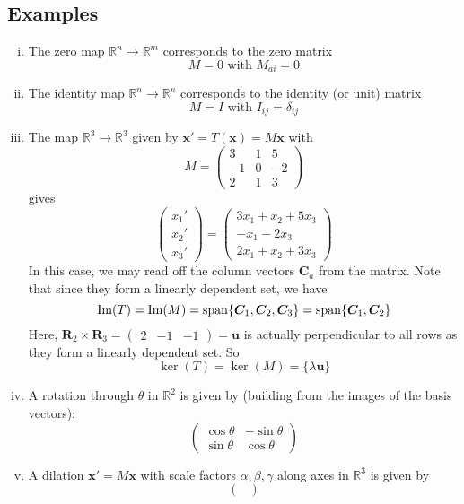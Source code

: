 \documentclass{article}
\begin{document}
	\subsection{Examples}
	\begin{enumerate}[(i)]
		\item The zero map $\mathbb R^n \to \mathbb R^m$ corresponds to the zero matrix
		\[ M = 0 \text{ with } M_{ai} = 0 \]
		\item The identity map $\mathbb R^n \to \mathbb R^n$ corresponds to the identity (or unit) matrix
		\[ M = I \text{ with } I_{ij} = \delta_{ij} \]
		\item The map $\mathbb R^3 \to \mathbb R^3$ given by $\bm x' = T(\bm x) = M\bm x$ with
		\[ M = \begin{pmatrix}
			3 & 1 & 5 \\
			-1 & 0 & -2 \\
			2 & 1 & 3
		\end{pmatrix} \]
		gives
		\[
			\begin{pmatrix}
				x_1' \\ x_2' \\ x_3'
			\end{pmatrix}
			=
			\begin{pmatrix}
				3x_1 + x_2 + 5x_3 \\
				-x_1 - 2x_3 \\
				2x_1 + x_2 + 3x_3
			\end{pmatrix}
		\]
		In this case, we may read off the column vectors $\bm C_a$ from the matrix. Note that since they form a linearly dependent set, we have
		\[ \Im(T) = \Im(M) = \operatorname{span} \{ \bm C_1, \bm C_2, \bm C_3 \} = \operatorname{span} \{ \bm C_1, \bm C_2 \} \]
		Here, $\bm R_2 \times \bm R_3 = \begin{pmatrix}
			2 & -1 & -1
		\end{pmatrix} = \bm u$ is actually perpendicular to all rows as they form a linearly dependent set. So
		\[ \ker(T) = \ker(M) = \{ \lambda \bm u \} \]
		\item A rotation through $\theta$ in $\mathbb R^2$ is given by (building from the images of the basis vectors):
		\[ \begin{pmatrix}
			\cos \theta & -\sin \theta \\
			\sin \theta & \cos \theta
		\end{pmatrix} \]
		\item A dilation $\bm x' = M \bm x$ with scale factors $\alpha, \beta, \gamma$ along axes in $\mathbb R^3$ is given by
		\[ \begin{pmatrix}

\end{pmatrix}\]
\end{enumerate}
\end{document}
